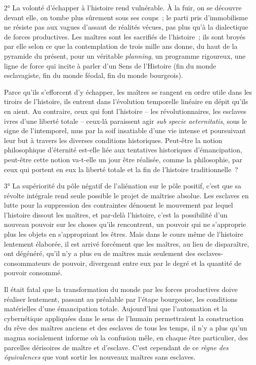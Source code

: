 \documentclass[french,twoside]{book} %
\begin{document}
2° La volonté d’échapper à l’histoire rend vulnérable. À la fuir, on se découvre devant elle, on tombe plus sûrement sous ses coups ; le parti pris d’immobilisme ne résiste pas aux vagues d’assaut de réalités vécues, pas plus qu’à la dialectique de forces productives. Les maîtres sont les sacrifiés de l’histoire ; ils sont broyés par elle selon ce que la contemplation de trois mille ans donne, du haut de la pyramide du présent, pour un véritable \emph{planning}, un programme rigoureux, une ligne de force qui incite à parler d’un Sens de l’Histoire (fin du monde esclavagiste, fin du monde féodal, fin du monde bourgeois).\par
Parce qu’ils s’efforcent d’y échapper, les maîtres se rangent en ordre utile dans les tiroirs de l’histoire, ils entrent dans l’évolution temporelle linéaire en dépit qu’ils en aient. Au contraire, ceux qui font l’histoire – les révolutionnaires, les esclaves ivres d’une liberté totale – ceux-là paraissent agir \emph{sub specie aeternitatis}, sous le signe de l’intemporel, mus par la soif insatiable d’une vie intense et poursuivant leur but à travers les diverses conditions historiques. Peut-être la notion philosophique d’éternité est-elle liée aux tentatives historiques d’émancipation, peut-être cette notion va-t-elle un jour être réalisée, comme la philosophie, par ceux qui portent en eux la liberté totale et la fin de l’histoire traditionnelle ?\par
3° La supériorité du pôle négatif de l’aliénation sur le pôle positif, c’est que sa révolte intégrale rend seule possible le projet de maîtrise absolue. Les esclaves en lutte pour la suppression des contraintes dénouent le mouvement par lequel l’histoire dissout les maîtres, et par-delà l’histoire, c’est la possibilité d’un nouveau pouvoir sur les choses qu’ils rencontrent, un pouvoir qui ne s’approprie plus les objets en s’appropriant les êtres. Mais dans le cours même de l’histoire lentement élaborée, il est arrivé forcément que les maîtres, au lieu de disparaître, ont dégénéré, qu’il n’y a plus eu de maîtres mais seulement des esclaves-consommateurs de pouvoir, divergeant entre eux par le degré et la quantité de pouvoir consommé.\par
Il était fatal que la transformation du monde par les forces productives doive réaliser lentement, passant au préalable par l’étape bourgeoise, les conditions matérielles d’une émancipation totale. Aujourd’hui que l’automation et la cybernétique appliquées dans le sens de l’humain permettraient la construction du rêve des maîtres anciens et des esclaves de tous les temps, il n’y a plus qu’un magma socialement informe où la confusion mêle, en chaque être particulier, des parcelles dérisoires de maître et d’esclave. C’est cependant de ce \emph{règne des équivalences} que vont sortir les nouveaux maîtres sans esclaves.\par
\end{document}
